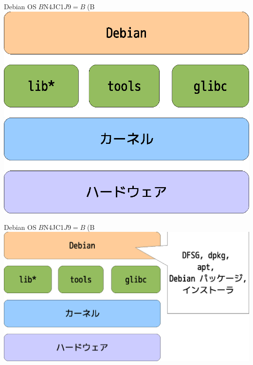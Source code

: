 {

\begin{frame}{Debian OS$B$N4JC1$J9=B$(B}
\includegraphics[width=0.7\hsize]{image201006/os-block01.eps}
\end{frame}


\begin{frame}{Debian OS$B$N4JC1$J9=B$(B}
\includegraphics[width=1.0\hsize]{image201006/os-block01-1.eps}
\end{frame}


}
